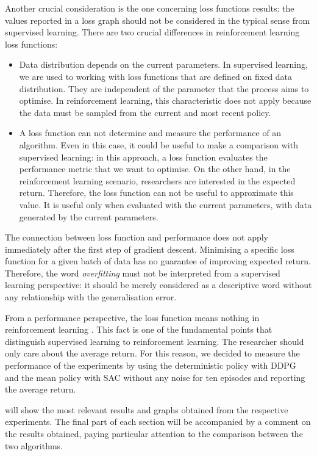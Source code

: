 Another crucial consideration is the one concerning loss functions results: the values reported in a loss graph should not be considered in the typical sense from supervised learning.
There are two crucial differences in reinforcement learning loss functions:

\begin{itemize}
	\item Data distribution depends on the current parameters.
	      In supervised learning, we are used to working with loss functions that are defined on fixed data distribution.
	      They are independent of the parameter that the process aims to optimise.
	      In reinforcement learning, this characteristic does not apply because the data must be sampled from the current and most recent policy.
	\item A loss function can not determine and measure the performance of an algorithm.
	      Even in this case, it could be useful to make a comparison with supervised learning: in this approach, a loss function evaluates the performance metric that we want to optimise.
	      On the other hand, in the reinforcement learning scenario, researchers are interested in the expected return.
	      Therefore, the loss function can not be useful to approximate this value.
	      It is useful only when evaluated with the current parameters, with data generated by the current parameters.
\end{itemize}

The connection between loss function and performance does not apply immediately after the first step of gradient descent.
Minimising a specific loss function for a given batch of data has no guarantee of improving expected return.
Therefore, the word \textit{overfitting} must not be interpreted from a supervised learning perspective: it should be merely considered as a descriptive word without any relationship with the generalisation error.

From a performance perspective, the loss function means nothing in reinforcement learning \cite{openai2018spinningup}.
This fact is one of the fundamental points that distinguish supervised learning to reinforcement learning.
The researcher should only care about the average return.
For this reason, we decided to measure the performance of the experiments by using the deterministic policy with DDPG and the mean policy with SAC without any noise for ten episodes and reporting the average return.

 will show the most relevant results and graphs obtained from the respective experiments.
The final part of each section will be accompanied by a comment on the results obtained, paying particular attention to the comparison between the two algorithms.


